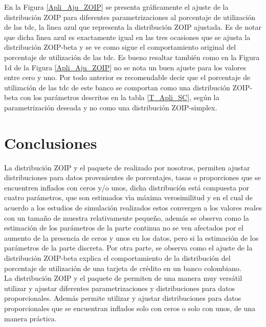 En la Figura \ref{Apli_Aju_ZOIP} se presenta gr\'{a}ficamente el ajuste de la distribuci\'{o}n ZOIP para diferentes parametrizaciones al porcentaje de utilizaci\'{o}n de las tdc, la l\'{\i}nea azul que representa la distribuci\'{o}n ZOIP ajustada. Es de notar que dicha l\'{\i}nea azul es exactamente igual en las tres ocasiones que se ajusta la distribuci\'{o}n ZOIP-beta y se ve como sigue el comportamiento original del porcentaje de utilizaci\'{o}n de las tdc. Es bueno resaltar tambi\'{e}n como en la Figura 1d de la Figura \ref{Apli_Aju_ZOIP} no se nota un buen ajuste para los valores entre cero y uno. Por todo anterior es recomendable decir que el porcentaje de utilizaci\'{o}n de las tdc de este banco se comportan como una distribuci\'{o}n ZOIP-beta con los par\'{a}metros descritos en la tabla \ref{T_Apli_SC}, seg\'{u}n la parametrizaci\'{o}n deseada y no como una distribuci\'{o}n ZOIP-simplex.


\section{Conclusiones}

La distribuci\'{o}n ZOIP y el paquete  de  realizado por nosotros, permiten ajustar distribuciones para datos provenientes de porcentajes, tasas o proporciones que se encuentren inflados con ceros y/o unos, dicha distribuci\'{o}n est\'{a} compuesta por cuatro par\'{a}metros, que son estimados v\'{\i}a m\'{a}xima verosimilitud y en el cual de acuerdo a los estudios de simulaci\'{o}n realizados estos convergen a los valores reales con un tama\~{n}o de muestra relativamente peque\~{n}o, adem\'{a}s se observa como la estimaci\'{o}n de los par\'{a}metros de la parte continua no se ven afectados por el aumento de la presencia de ceros y unos en los datos, pero si la estimaci\'{o}n de los par\'{a}metros de la parte discreta. Por otra parte, se observa como el ajuste de la distribuci\'{o}n ZOIP-beta explica el comportamiento de la distribuci\'{o}n del porcentaje de utilizaci\'{o}n de una tarjeta de cr\'{e}dito en un banco colombiano.\\

La distribuci\'{o}n ZOIP y el paquete  de  permiten de una manera muy vers\'{a}til utilizar y ajustar diferentes parametrizaciones y distribuciones para datos proporcionales. Adem\'{a}s permite utilizar y ajustar distribuciones para datos proporcionales que se encuentran inflados solo con ceros o solo con unos, de una manera pr\'{a}ctica.
